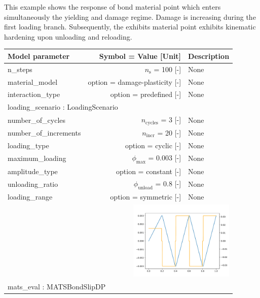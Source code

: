\documentclass{article}
\newcounter{bmcsexample}
\begin{document}
        
\begin{bmcsexample}
\noindent This example shows the response of bond material point 
which enters simultaneously the yielding and damage regime. Damage is 
increasing during the first loading branch. Subsequently, the exhibits
material point exhibits kinematic hardening upon unloading and reloading.
 \\[3mm]
\begin{center}
\begin{tabular}{lrp{4cm}}\hline
Model parameter & Symbol = Value [Unit] & Description  \\\hline \hline
n\_steps & $n_\mathrm{s}$ = 100 [-] & {\footnotesize None}  \\
            material\_model & option = damage-plasticity [-] & {\footnotesize None}  \\
            interaction\_type & option = predefined [-] & {\footnotesize None}  \\
            \hline
\multicolumn{3}{l}{loading\_scenario : LoadingScenario}\\ \hline

number\_of\_cycles & $n_\mathrm{cycles}$ = 3 [-] & {\footnotesize None}  \\
            number\_of\_increments & $n_{\mathrm{incr}}$ = 20 [-] & {\footnotesize None}  \\
            loading\_type & option = cyclic [-] & {\footnotesize None}  \\
            maximum\_loading & $\phi_{\max}$ = 0.003 [-] & {\footnotesize None}  \\
            amplitude\_type & option = constant [-] & {\footnotesize None}  \\
            unloading\_ratio & $\phi_{\mathrm{unload}}$ = 0.8 [-] & {\footnotesize None}  \\
            loading\_range & option = symmetric [-] & {\footnotesize None}  \\
            
\multicolumn{3}{r}{\includegraphics[width=5cm]{fig140677184635824.pdf}}\\
\hline
\multicolumn{3}{l}{mats\_eval : MATSBondSlipDP}\\ \hline


\end{tabular}
\end{center}
\end{bmcsexample}
\end{document}
